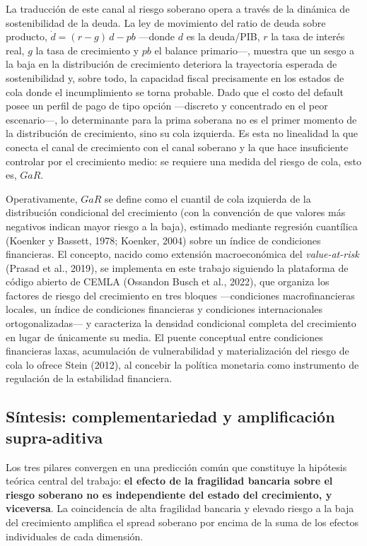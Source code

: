\documentclass[5p,times,twocolumn,authoryear]{elsarticle}
\begin{document}
La traducción de este canal al riesgo soberano opera a través de la dinámica de sostenibilidad de la deuda. La ley de movimiento del ratio de deuda sobre producto, $\dot{d} = (r - g)\,d - pb$ —donde $d$ es la deuda/PIB, $r$ la tasa de interés real, $g$ la tasa de crecimiento y $pb$ el balance primario—, muestra que un sesgo a la baja en la distribución de crecimiento deteriora la trayectoria esperada de sostenibilidad y, sobre todo, la capacidad fiscal precisamente en los estados de cola donde el incumplimiento se torna probable. Dado que el costo del default posee un perfil de pago de tipo opción —discreto y concentrado en el peor escenario—, lo determinante para la prima soberana no es el primer momento de la distribución de crecimiento, sino su cola izquierda. Es esta no linealidad la que conecta el canal de crecimiento con el canal soberano y la que hace insuficiente controlar por el crecimiento medio: se requiere una medida del riesgo de cola, esto es, $GaR$.

Operativamente, $GaR$ se define como el cuantil de cola izquierda de la distribución condicional del crecimiento (con la convención de que valores más negativos indican mayor riesgo a la baja), estimado mediante regresión cuantílica (Koenker y Bassett, 1978; Koenker, 2004) sobre un índice de condiciones financieras. El concepto, nacido como extensión macroeconómica del \textit{value-at-risk} (Prasad et al., 2019), se implementa en este trabajo siguiendo la plataforma de código abierto de CEMLA (Ossandon Busch et al., 2022), que organiza los factores de riesgo del crecimiento en tres bloques —condiciones macrofinancieras locales, un índice de condiciones financieras y condiciones internacionales ortogonalizadas— y caracteriza la densidad condicional completa del crecimiento en lugar de únicamente su media. El puente conceptual entre condiciones financieras laxas, acumulación de vulnerabilidad y materialización del riesgo de cola lo ofrece Stein (2012), al concebir la política monetaria como instrumento de regulación de la estabilidad financiera.

\subsection{Síntesis: complementariedad y amplificación supra-aditiva}

Los tres pilares convergen en una predicción común que constituye la hipótesis teórica central del trabajo: \textbf{el efecto de la fragilidad bancaria sobre el riesgo soberano no es independiente del estado del crecimiento, y viceversa}. La coincidencia de alta fragilidad bancaria y elevado riesgo a la baja del crecimiento amplifica el spread soberano por encima de la suma de los efectos individuales de cada dimensión.
\end{document}
